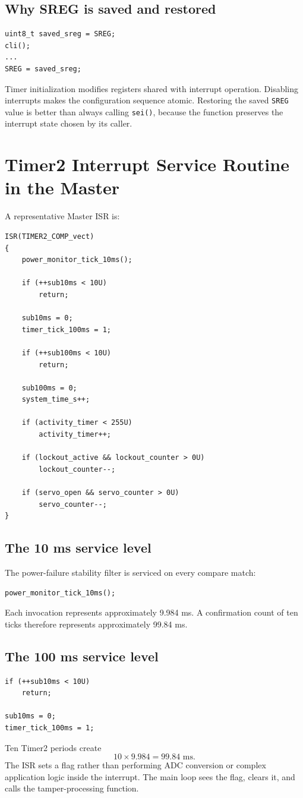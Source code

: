 \documentclass[11pt,a4paper]{article}
\begin{document}
\subsection{Why SREG is saved and restored}
\begin{lstlisting}[style=cstyle]
uint8_t saved_sreg = SREG;
cli();
...
SREG = saved_sreg;
\end{lstlisting}
Timer initialization modifies registers shared with interrupt operation. Disabling interrupts makes the configuration sequence atomic. Restoring the saved \texttt{SREG} value is better than always calling \texttt{sei()}, because the function preserves the interrupt state chosen by its caller.

\section{Timer2 Interrupt Service Routine in the Master}
A representative Master ISR is:
\begin{lstlisting}[style=cstyle,caption={Master Timer2 compare ISR.}]
ISR(TIMER2_COMP_vect)
{
    power_monitor_tick_10ms();

    if (++sub10ms < 10U)
        return;

    sub10ms = 0;
    timer_tick_100ms = 1;

    if (++sub100ms < 10U)
        return;

    sub100ms = 0;
    system_time_s++;

    if (activity_timer < 255U)
        activity_timer++;

    if (lockout_active && lockout_counter > 0U)
        lockout_counter--;

    if (servo_open && servo_counter > 0U)
        servo_counter--;
}
\end{lstlisting}

\subsection{The 10 ms service level}
The power-failure stability filter is serviced on every compare match:
\begin{lstlisting}[style=cstyle]
power_monitor_tick_10ms();
\end{lstlisting}
Each invocation represents approximately 9.984 ms. A confirmation count of ten ticks therefore represents approximately 99.84 ms.

\subsection{The 100 ms service level}
\begin{lstlisting}[style=cstyle]
if (++sub10ms < 10U)
    return;

sub10ms = 0;
timer_tick_100ms = 1;
\end{lstlisting}
Ten Timer2 periods create
\[
10\times9.984=99.84\text{ ms}.
\]
The ISR sets a flag rather than performing ADC conversion or complex application logic inside the interrupt. The main loop sees the flag, clears it, and calls the tamper-processing function.
\end{document}
